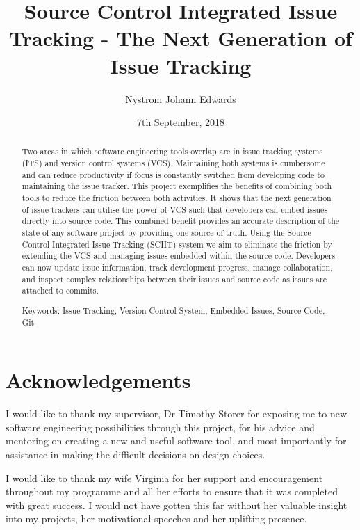 \documentclass{mproj}
\begin{document}
\title{Source Control Integrated Issue Tracking - The Next Generation of Issue Tracking}
\author{Nystrom Johann Edwards}
\date{7th September, 2018}
\maketitle

\begin{abstract}
Two areas in which software engineering tools overlap are in issue tracking systems (ITS) and version control systems (VCS). Maintaining both systems is cumbersome and can reduce productivity if focus is constantly switched from developing code to maintaining the issue tracker. This project exemplifies the benefits of combining both tools to reduce the friction between both activities. It shows that the next generation of issue trackers can utilise the power of VCS such that developers can embed issues directly into source code. This combined benefit provides an accurate description of the state of any software project by providing one source of truth. Using the Source Control Integrated Issue Tracking (SCIIT) system we aim to eliminate the friction by extending the VCS and managing issues embedded within the source code. Developers can now update issue information, track development progress, manage collaboration, and inspect complex relationships between their issues and source code as issues are attached to commits.  

Keywords: Issue Tracking, Version Control System, Embedded Issues, Source Code, Git
\end{abstract}

\educationalconsent
\newpage

\section*{Acknowledgements}

I would like to thank my supervisor, Dr Timothy Storer for exposing me to new software engineering possibilities through this project, for his advice and mentoring on creating a new and useful software tool, and most importantly for assistance in making the difficult decisions on design choices.

I would like to thank my wife Virginia for her support and encouragement throughout my programme and all her efforts to ensure that it was completed with great success. I would not have gotten this far without her valuable insight into my projects, her motivational speeches and her uplifting presence.
\end{document}
